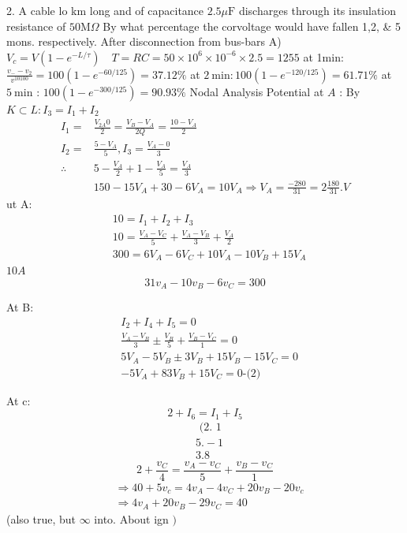 \documentclass[12pt, a4paper]{article}
\begin{document}
2. A cable lo km long and of capacitance $2.5 \mu \mathrm{F}$ discharges through its insulation resistance of $50 \mathrm{M} \Omega$ By what percentage the corvoltage would have fallen 1,2, \& 5 mons. respectively. After disconnection from bus-bars
A) $V_c=V\left(1-e^{-L / \tau}\right) \quad T=R C=50 \times 10^6 \times 10^{-6} \times 2.5=1255$
at 1min: $\frac{v_{-}-v_2}{v^{10100}}=100\left(1-e^{-60 / 125}\right)=37.12 \%$
at $2 \mathrm{~min}: 100\left(1-e^{-120 / 125}\right)=61.71 \%$
at $5 \mathrm{~min}$ : $100\left(1-e^{-300 / 125}\right)=90.93 \%$
Nodal Analysis
Potential at $A$ :
By $K \subset L: I_3=I_1+I_2$
$$
	\begin{aligned}
		I_1=       & \frac{V_{2 A} 0}{2}=\frac{V_B-V_A}{2 Q}=\frac{10-V_A}{2}                        \\
		I_2=       & \frac{5-V_A}{5}, I_3=\frac{V_A-0}{3}                                            \\
		\therefore & 5-\frac{V_A}{2}+1-\frac{V_A}{5}=\frac{V_A}{3}                                   \\
		           & 150-15 V_A+30-6 V_A=10 V_A \Rightarrow V_A=\frac{-280}{31}=2 \frac{180}{31} . V
	\end{aligned}
$$
ut A:
$$
	\begin{aligned}
		 & 10=I_1+I_2+I_3                                       \\
		 & 10=\frac{V_A-V_C}{5}+\frac{V_A-V_B}{3}+\frac{V_A}{2} \\
		 & 300=6 V_A-6 V_C+10 V_A-10 V_B+15 V_A
	\end{aligned}
$$
$10 A$
$$
	31 v_A-10 v_B-6 v_C=300
$$

At B:
$$
	\begin{aligned}
		 & I_2+I_4+I_5=0                                           \\
		 & \frac{V_A-V_B}{3} \pm \frac{V_B}{5}+\frac{V_B-V_C}{1}=0 \\
		 & 5 V_A-5 V_B \pm 3 V_B+15 V_B-15 V_C=0                   \\
		 & -5 V_A+83 V_B+15 V_C=0 \text {-(2) }
	\end{aligned}
$$

At c:
$$
	2+I_6=I_1+I_5
$$
$$
	\begin{aligned}
		 & \text { (2. } 1 \\
		 & 5 .-1           \\
		 & 3.8
	\end{aligned}
$$
$$
	2+\frac{v_C}{4}=\frac{v_A-v_C}{5}+\frac{v_B-v_C}{1}
$$
$$
	\begin{aligned}
		 & \Rightarrow 40+5 v_c=4 v_A-4 v_C+20 v_B-20 v_c \\
		 & \Rightarrow 4 v_A+20 v_B-29 v_C=40
	\end{aligned}
$$
(also true, but $\infty$ into. About ign $)$
\end{document}
